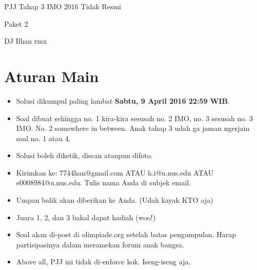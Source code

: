 \documentclass{article}
\begin{document}
	\begin{center}
		{\huge PJJ Tahap 3 IMO 2016 Tidak Resmi}
		
		\vspace{1em}
		
		{\Large Paket 2}
		
		\vspace{1em}
		
		DJ Ilhan rmx
	\end{center}
	\section{Aturan Main}
	\begin{itemize}
		\item Solusi dikumpul paling lambat \textbf{Sabtu, 9 April 2016 22:59 WIB}.
		\item Soal dibuat sehingga no. 1 kira-kira sesusah no. 2 IMO, no. 3 sesusah no. 3 IMO. No. 2 somewhere in between. Anak tahap 3 udah ga jaman ngerjain soal no. 1 atau 4.
		\item Solusi boleh diketik, discan ataupun difoto.
		\item Kirimkan ke: 7744han@gmail.com ATAU h.i@u.nus.edu ATAU e0008984@u.nus.edu. Tulis nama Anda di subjek email.
		\item Umpan balik akan diberikan ke Anda. (Udah kayak KTO aja)
		\item Juara 1, 2, dan 3 bakal dapat hadiah (woo!)
		\item Soal akan di-post di olimpiade.org setelah batas pengumpulan. Harap partisipasinya dalam meramekan forum anak bangsa.
		\item Above all, PJJ ini tidak di-enforce kok. Iseng-iseng aja.
	\end{itemize}
\end{document}
